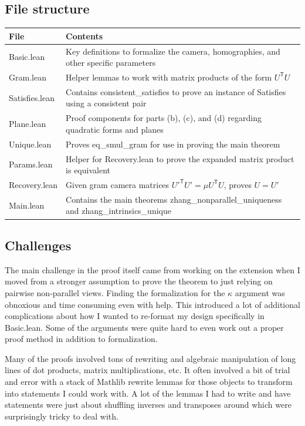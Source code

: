 \documentclass[10pt]{article}
\theoremstyle{plain}
\theoremstyle{definition}
\theoremstyle{remark}
\newcommand{\T}{^{\mathsf{T}}}
\newcommand{\lean}[1]{{\ttfamily\let\us\_\def\_{\us\allowbreak}#1}}
\begin{document}
\subsection{File structure}
\begin{center}
\begin{tabular}{@{}lp{5in}@{}}
  \toprule
  File & Contents \\
  \midrule
  \lean{Basic.lean}     &  Key definitions to formalize the camera, homographies, and other specific parameters
  \\
  \lean{Gram.lean}      & Helper lemmas to work with matrix products of the form $U\T U$\\
  \lean{Satisfies.lean} & Contains \lean{consistent\_satisfies} to prove an instance of \lean{Satisfies} using a consistent pair\\
  \lean{Plane.lean}     & Proof components for parts (b), (c), and (d) regarding quadratic forms and planes\\
  \lean{Unique.lean}    & Proves \lean{eq\_smul\_gram} for use in proving the main theorem\\
  \lean{Params.lean}    & Helper for \lean{Recovery.lean} to prove the expanded matrix product is equivalent\\
  \lean{Recovery.lean}  & Given gram camera matrices ${U'}\T U'=\mu U\T U$, proves $U=U'$\\
  \lean{Main.lean}      & Contains the main theorems \lean{zhang\_nonparallel\_uniqueness} and \lean{zhang\_intrinsics\_unique}\\
  \bottomrule
\end{tabular}
\end{center}

\subsection{Challenges}

The main challenge in the proof itself came from working on the extension when I moved from a stronger assumption to prove the theorem to just relying on pairwise non-parallel views. Finding the formalization for the $\kappa$ argument was obnoxious and time consuming even with help. This introduced a lot of additional complications about how I wanted to re-format my design specifically in \lean{Basic.lean}. Some of the arguments were quite hard to even work out a proper proof method in addition to formalization. 

Many of the proofs involved tons of rewriting and algebraic manipulation of long lines of dot products, matrix multiplications, etc. It often involved a bit of trial and error with a stack of Mathlib rewrite lemmas for those objects to transform into statements I could work with. A lot of the lemmas I had to write and \lean{have} statements were just about shuffling inverses and transposes around which were surprisingly tricky to deal with.
\end{document}
